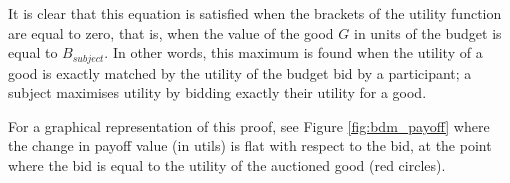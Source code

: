 It is clear that this equation is satisfied when the brackets of the utility function are equal to zero, that is, when the value of the good $G$ in units of the budget is equal to $B_{subject}$. In other words, this maximum is found when the utility of a good is exactly matched by the utility of the budget bid by a participant; a subject maximises utility by bidding exactly their utility for a good. 

For a graphical representation of this proof, see Figure \ref{fig:bdm_payoff} where the change in payoff value (in utils) is flat with respect to the bid, at the point where the bid is equal to the utility of the auctioned good (red circles).
